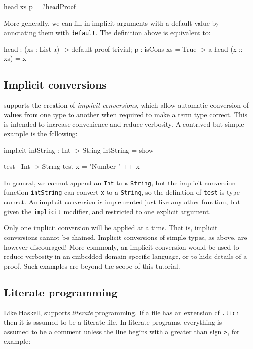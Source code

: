 \begin{code}
head xs {p = ?headProof} 
\end{code} 

\noindent
More generally, we can fill in implicit arguments with a default value by annotating
them with \texttt{default}. The definition above is equivalent to:

\begin{code}
head : (xs : List a) -> 
       {default proof { trivial; } p : isCons xs = True} -> a
head (x :: xs) = x
\end{code} 

\subsection{Implicit conversions}

\Idris{} supports the creation of \emph{implicit conversions}, which allow
automatic conversion of values from one type to another when required to make
a term type correct. This is intended to increase convenience and reduce
verbosity. A contrived but simple example is the following:

\begin{code}
implicit intString : Int -> String
intString = show
  
test : Int -> String
test x = "Number " ++ x
\end{code}

\noindent
In general, we cannot append an \texttt{Int} to a \texttt{String}, but the
implicit conversion function \texttt{intString} can convert \texttt{x} to a
\texttt{String}, so the definition of \texttt{test} is type correct. An
implicit conversion is implemented just like any other function, but given
the \texttt{implicit} modifier, and restricted to one explicit argument.

Only one implicit conversion will be applied at a time. That is, implicit
conversions cannot be chained.
Implicit conversions of simple types, as above, are however discouraged! More
commonly, an implicit conversion would be used to reduce verbosity in an
embedded domain specific language, or to hide details of a proof. Such examples
are beyond the scope of this tutorial.

\subsection{Literate programming}

Like Haskell, \Idris{} supports \emph{literate} programming. If a file has an
extension of \texttt{.lidr} then it is assumed to be a literate file. In literate
programs, everything is assumed to be a comment unless the line begins with a
greater than sign \texttt{>}, for example:

